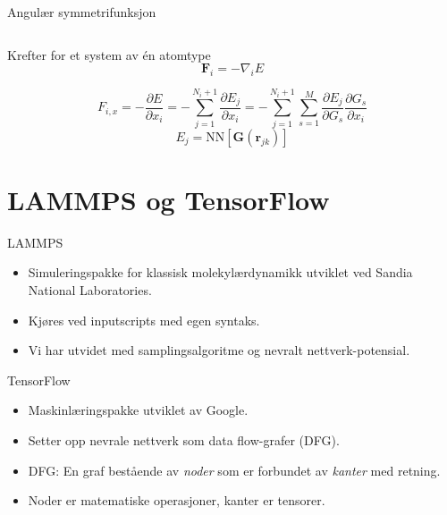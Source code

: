 \documentclass{beamer}
\begin{document}
\begin{frame}{Angulær symmetrifunksjon}
\begin{columns}
\begin{column}{0.5\linewidth}
  \end{column}
\end{columns}

\end{frame}


\begin{frame}

\begin{block}{Krefter for et system av én atomtype}
 \begin{equation*}
  \mathbf{F}_i = -\nabla_i E
 \end{equation*}

 \begin{equation*}
  F_{i,x} = -\frac{\partial E}{\partial x_i} =
  -\sum_{j=1}^{N_i+1}\frac{\partial E_j}{\partial x_i} = 
  -\sum_{j=1}^{N_i+1}\sum_{s=1}^M\frac{\partial E_j}{\partial G_s}\frac{\partial G_s}{\partial x_i}
 \end{equation*}
 \begin{equation*}
  E_j = \mathrm{NN}[\mathbf{G}(\mathbf{r}_{jk})]
 \end{equation*}
\end{block}

\end{frame}


\section{LAMMPS og TensorFlow}


\begin{frame}

\begin{block}{LAMMPS}
 \begin{itemize}
  \item Simuleringspakke for klassisk molekylærdynamikk utviklet ved Sandia National Laboratories. 
  \item Kjøres ved inputscripts med egen syntaks. 
  \item Vi har utvidet med samplingsalgoritme og nevralt nettverk-potensial.
 \end{itemize}
\end{block}

\end{frame}


\begin{frame}

\begin{block}{TensorFlow}
 \begin{itemize}
  \item Maskinlæringspakke utviklet av Google. 
  \item Setter opp nevrale nettverk som data flow-grafer (DFG). 
  \item DFG: En graf bestående av \textit{noder} som er forbundet av \textit{kanter} med retning. 
  \item Noder er matematiske operasjoner, kanter er tensorer. 
 \end{itemize}
\end{block}

\end{frame}
\end{document}
